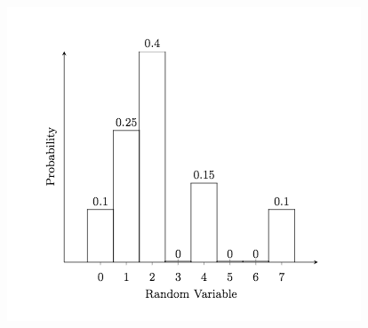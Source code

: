 \documentclass[10pt,]{book}
\theoremstyle{plain}
\theoremstyle{definition}
\theoremstyle{definition}
\theoremstyle{definition}
\numberwithin{equation}{section}
\begin{document}
	
	\includegraphics[width=1\linewidth]{images/DiscreteHistogramExample.png}

\par
\end{document}
